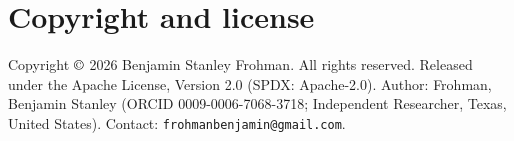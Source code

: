 \documentclass[11pt]{article}
\theoremstyle{plain}
\theoremstyle{definition}
\theoremstyle{remark}
\begin{document}
\section*{Copyright and license}

Copyright \(\copyright\) 2026 Benjamin Stanley Frohman. All rights reserved. Released under the Apache License, Version 2.0 (SPDX: Apache-2.0). Author: Frohman, Benjamin Stanley (ORCID 0009-0006-7068-3718; Independent Researcher, Texas, United States). Contact: \texttt{frohmanbenjamin@gmail.com}.
\end{document}
